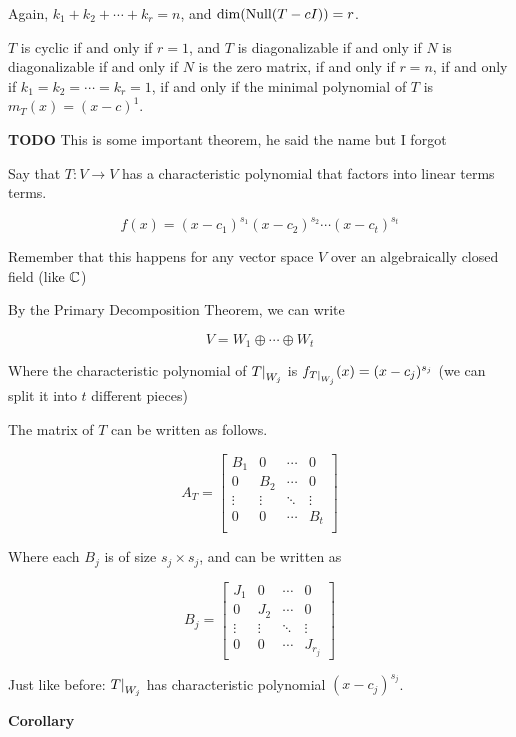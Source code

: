 \documentclass[12pt]{article}
\newcommand{\TODO}{\color{red}\textbf{TODO}\color{black}}
\begin{document}
  Again, $k_1 + k_2 + \cdots + k_r = n$, and $\dim(\mathrm{Null}(T - cI)) = r$.

  $T$ is cyclic if and only if $r = 1$, and $T$ is diagonalizable if and only if
  $N$ is diagonalizable if and only if $N$ is the zero matrix, if and only if $r
  = n$, if and only if $k_1 = k_2 = \cdots = k_r = 1$, if and only if the
  minimal polynomial of $T$ is $m_T(x) = (x - c)^1$.

  \TODO{} This is some important theorem, he said the name but I forgot

  Say that $T: V \to V$ has a characteristic polynomial that factors into linear
  terms terms. 

  \[
    f(x) = (x - c_1)^{s_1} (x - c_2)^{s_2} \cdots (x - c_t)^{s_t}
  \]

  Remember that this happens for any vector space $V$ over an algebraically
  closed field (like ${\mathbb C}$)

  By the Primary Decomposition Theorem, we can write

  \[
    V = W_1 \oplus \cdots \oplus W_t
  \]

  Where the characteristic polynomial of $\restr{T}{W_j}$ is
  $f_{\restr{T}{W_j}}(x) = (x - c_j)^{s_j}$ (we can split it into $t$ different
  pieces)

  The matrix of $T$ can be written as follows.

  \[
    A_T = \begin{bmatrix}
      B_1 & 0 & \cdots & 0 \\
      0 & B_2 & \cdots & 0 \\
      \vdots & \vdots & \ddots & \vdots \\
      0 & 0 & \cdots & B_t \\
    \end{bmatrix}
  \]

  Where each $B_j$ is of size $s_j \times s_j$, and can be written as

  \[
    B_j = \begin{bmatrix}
      J_1 & 0 & \cdots & 0 \\
      0 & J_2 & \cdots & 0 \\
      \vdots & \vdots & \ddots & \vdots \\
      0 & 0 & \cdots & J_{r_j}
    \end{bmatrix}
  \]

  Just like before: $\restr{T}{W_j}$ has characteristic polynomial $(x -
  c_j)^{s_j}$.

  {\bf Corollary}
\end{document}
